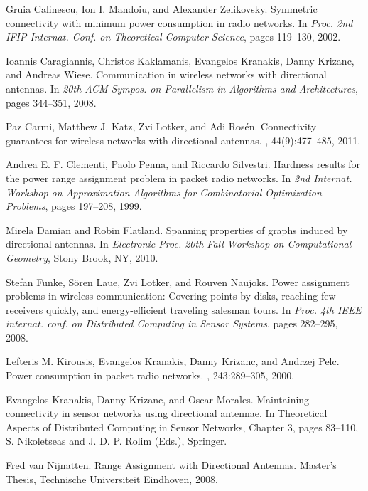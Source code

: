 \documentclass[11pt,letter]{article}
\begin{document}
\begin{thebibliography}{1}
Gruia Calinescu, Ion I. Mandoiu, and Alexander Zelikovsky.
\newblock Symmetric connectivity with minimum power consumption in radio networks.
\newblock In {\em Proc. 2nd IFIP Internat. Conf. on Theoretical Computer Science}, pages 119--130, 2002.

Ioannis Caragiannis, Christos Kaklamanis, Evangelos Kranakis, Danny Krizanc, and Andreas Wiese.
\newblock Communication in wireless networks with directional antennas.
\newblock In {\em 20th ACM Sympos. on Parallelism in Algorithms and Architectures}, pages 344--351, 2008.

Paz Carmi, Matthew J. Katz, Zvi Lotker, and Adi Ros\'{e}n.
\newblock Connectivity guarantees for wireless networks with directional antennas.
, 44(9):477--485, 2011.

Andrea E. F. Clementi, Paolo Penna, and Riccardo Silvestri.
\newblock Hardness results for the power range assignment problem in packet radio networks.
\newblock In {\em 2nd Internat. Workshop on Approximation Algorithms for Combinatorial Optimization Problems}, pages 197--208, 1999.

Mirela Damian and Robin Flatland.
\newblock Spanning properties of graphs induced by directional antennas.
\newblock In {\em Electronic Proc. 20th Fall Workshop on Computational Geometry},
Stony Brook, NY, 2010.

Stefan Funke, S\"{o}ren Laue, Zvi Lotker, and Rouven Naujoks.
\newblock Power assignment problems in wireless communication: Covering points by disks, reaching
few receivers quickly, and energy-efficient traveling salesman tours.
\newblock In {\em Proc. 4th IEEE internat. conf. on Distributed Computing in Sensor Systems}, pages 282--295, 2008.

Lefteris M. Kirousis, Evangelos Kranakis, Danny Krizanc, and Andrzej Pelc.
\newblock Power consumption in packet radio networks.
, 243:289--305, 2000.









Evangelos Kranakis, Danny Krizanc, and Oscar Morales.
\newblock Maintaining connectivity in sensor networks using directional antennae.
In Theoretical Aspects of Distributed Computing in Sensor Networks, Chapter 3, pages 83--110, S. Nikoletseas and J. D. P. Rolim (Eds.), Springer.

Fred van Nijnatten.
\newblock Range Assignment with Directional Antennas.
\newblock Master's Thesis, Technische Universiteit Eindhoven, 2008.

\end{thebibliography}
\end{document}
